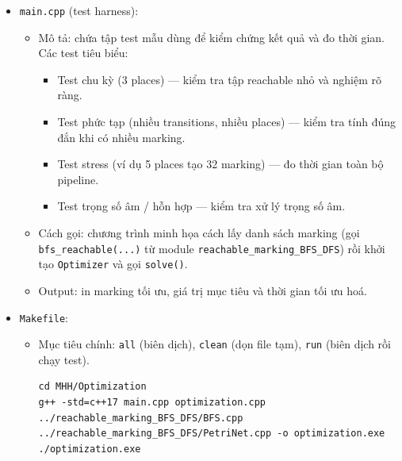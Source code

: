 \documentclass[12pt,a4paper]{article}
\begin{document}
\begin{itemize}
    \item \texttt{main.cpp} (test harness):
        \begin{itemize}
            \item Mô tả: chứa tập test mẫu dùng để kiểm chứng kết quả và đo thời gian. Các test tiêu biểu:
                \begin{itemize}
                    \item Test chu kỳ (3 places) — kiểm tra tập reachable nhỏ và nghiệm rõ ràng.
                    \item Test phức tạp (nhiều transitions, nhiều places) — kiểm tra tính đúng đắn khi có nhiều marking.
                    \item Test stress (ví dụ 5 places tạo 32 marking) — đo thời gian toàn bộ pipeline.
                    \item Test trọng số âm / hỗn hợp — kiểm tra xử lý trọng số âm.
                \end{itemize}
            \item Cách gọi: chương trình minh họa cách lấy danh sách marking (gọi \texttt{bfs\_reachable(...)} từ module \texttt{reachable\_marking\_BFS\_DFS}) rồi khởi tạo \texttt{Optimizer} và gọi \texttt{solve()}.
            \item Output: in marking tối ưu, giá trị mục tiêu và thời gian tối ưu hoá.
        \end{itemize}

    \item \texttt{Makefile}:
        \begin{itemize}
            \item Mục tiêu chính: \texttt{all} (biên dịch), \texttt{clean} (dọn file tạm), \texttt{run} (biên dịch rồi chạy test).
            \begin{verbatim}
cd MHH/Optimization
g++ -std=c++17 main.cpp optimization.cpp ../reachable_marking_BFS_DFS/BFS.cpp ../reachable_marking_BFS_DFS/PetriNet.cpp -o optimization.exe
./optimization.exe
            \end{verbatim}
        \end{itemize}



\end{itemize}
\end{document}
